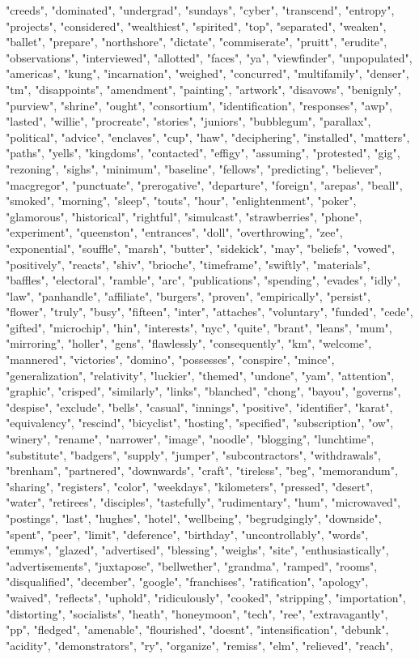 "creeds", "dominated", "undergrad", "sundays", "cyber", "transcend", "entropy", "projects", "considered", "wealthiest", "spirited", "top", "separated", "weaken", "ballet", "prepare", "northshore", "dictate", "commiserate", "pruitt", "erudite", "observations", "interviewed", "allotted", "faces", "ya", "viewfinder", "unpopulated", "americas", "kung", "incarnation", "weighed", "concurred", "multifamily", "denser", "tm", "disappoints", "amendment", "painting", "artwork", "disavows", "benignly", "purview", "shrine", "ought", "consortium", "identification", "responses", "awp", "lasted", "willie", "procreate", "stories", "juniors", "bubblegum", "parallax", "political", "advice", "enclaves", "cup", "haw", "deciphering", "installed", "matters", "paths", "yells", "kingdoms", "contacted", "effigy", "assuming", "protested", "gig", "rezoning", "sighs", "minimum", "baseline", "fellows", "predicting", "believer", "macgregor", "punctuate", "prerogative", "departure", "foreign", "arepas", "beall", "smoked", "morning", "sleep", "touts", "hour", "enlightenment", "poker", "glamorous", "historical", "rightful", "simulcast", "strawberries", "phone", "experiment", "queenston", "entrances", "doll", "overthrowing", "zee", "exponential", "souffle", "marsh", "butter", "sidekick", "may", "beliefs", "vowed", "positively", "reacts", "shiv", "brioche", "timeframe", "swiftly", "materials", "baffles", "electoral", "ramble", "arc", "publications", "spending", "evades", "idly", "law", "panhandle", "affiliate", "burgers", "proven", "empirically", "persist", "flower", "truly", "busy", "fifteen", "inter", "attaches", "voluntary", "funded", "cede", "gifted", "microchip", "hin", "interests", "nyc", "quite", "brant", "leans", "mum", "mirroring", "holler", "gens", "flawlessly", "consequently", "km", "welcome", "mannered", "victories", "domino", "possesses", "conspire", "mince", "generalization", "relativity", "luckier", "themed", "undone", "yam", "attention", "graphic", "crisped", "similarly", "links", "blanched", "chong", "bayou", "governs", "despise", "exclude", "bells", "casual", "innings", "positive", "identifier", "karat", "equivalency", "rescind", "bicyclist", "hosting", "specified", "subscription", "ow", "winery", "rename", "narrower", "image", "noodle", "blogging", "lunchtime", "substitute", "badgers", "supply", "jumper", "subcontractors", "withdrawals", "brenham", "partnered", "downwards", "craft", "tireless", "beg", "memorandum", "sharing", "registers", "color", "weekdays", "kilometers", "pressed", "desert", "water", "retirees", "disciples", "tastefully", "rudimentary", "hum", "microwaved", "postings", "last", "hughes", "hotel", "wellbeing", "begrudgingly", "downside", "spent", "peer", "limit", "deference", "birthday", "uncontrollably", "words", "emmys", "glazed", "advertised", "blessing", "weighs", "site", "enthusiastically", "advertisements", "juxtapose", "bellwether", "grandma", "ramped", "rooms", "disqualified", "december", "google", "franchises", "ratification", "apology", "waived", "reflects", "uphold", "ridiculously", "cooked", "stripping", "importation", "distorting", "socialists", "heath", "honeymoon", "tech", "ree", "extravagantly", "pp", "fledged", "amenable", "flourished", "doesnt", "intensification", "debunk", "acidity", "demonstrators", "ry", "organize", "remiss", "elm", "relieved", "reach", 